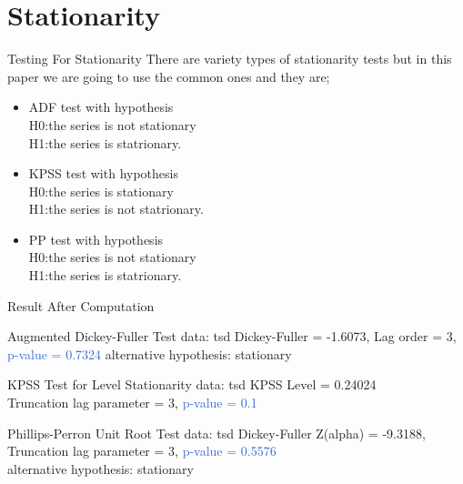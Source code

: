 \documentclass{beamer}
\begin{document}
	\section{Stationarity}
	\begin{frame}{Testing For Stationarity}
		There are variety types of stationarity tests but in this paper we are going to use the common ones and they are;
		
		\begin{itemize}
			\item ADF test with hypothesis \\
			H0:the series is not stationary \\
			H1:the series is statrionary. \vspace{5pt}
			
			\item KPSS test with hypothesis \\
			H0:the series is stationary \\
			H1:the series is not statrionary. \vspace{5pt}
			
			\item PP test with hypothesis \\
			H0:the series is not stationary \\
			H1:the series is statrionary. \\
		\end{itemize}
	\end{frame}

	\begin{frame}{Result After Computation}
			\begin{block}{Augmented Dickey-Fuller Test}
				data: tsd Dickey-Fuller = -1.6073, Lag order = 3, \\
				\textcolor{\highlight}{p-value = 0.7324} alternative hypothesis: stationary \vspace{5pt}
			\end{block}
			
			\begin{alertblock}{KPSS Test for Level Stationarity}
				data: tsd KPSS Level = 0.24024 \\
				Truncation lag parameter = 3, \textcolor{\highlight}{p-value = 0.1} \vspace{5pt}
			\end{alertblock}
			
			\begin{exampleblock}{Phillips-Perron Unit Root Test}
				data: tsd Dickey-Fuller Z(alpha) = -9.3188, \\
				Truncation lag parameter = 3, \textcolor{\highlight}{p-value = 0.5576} \\
				alternative hypothesis: stationary
			\end{exampleblock}
	\end{frame}
	
\end{document}
